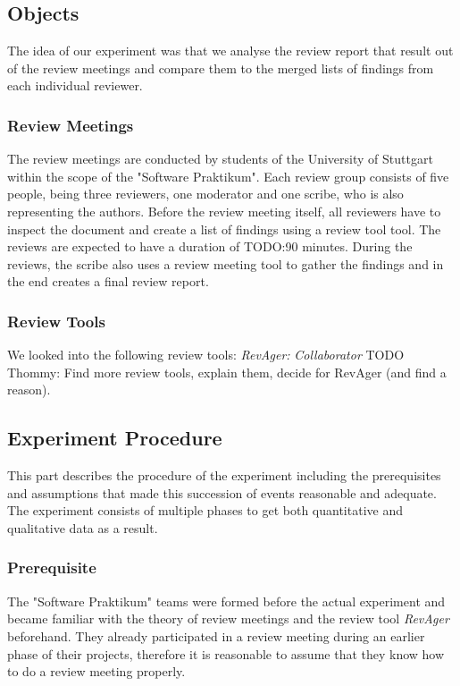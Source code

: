 \subsection{Objects}

The idea of our experiment was that we analyse the review report that result out of the review meetings and compare them to the merged lists of findings from each individual reviewer.

\subsubsection{Review Meetings}

The review meetings are conducted by students of the University of Stuttgart within the scope of the "Software Praktikum". Each review group consists of five people, being three reviewers, one moderator and one scribe, who is also representing the authors. Before the review meeting itself, all reviewers have to inspect the document and create a list of findings using a review tool \cite{TODO:revager Thommy} tool. The reviews are expected to have a duration of TODO:90 minutes. During the reviews, the scribe also uses a review meeting tool to gather the findings and in the end creates a final review report.

\subsubsection{Review Tools}

We looked into the following review tools:
\textit{RevAger:}
\textit{Collaborator}
TODO Thommy: Find more review tools, explain them, decide for RevAger (and find a reason).

\subsection{Experiment Procedure}
This part describes the procedure of the experiment including the prerequisites and assumptions that made this succession of events  reasonable and adequate.
The experiment consists of multiple phases to get both quantitative and qualitative data as a result.
\subsubsection{Prerequisite}
The "Software Praktikum" teams were formed before the actual experiment and became familiar with the theory of review meetings and the review tool \textit{RevAger} beforehand.
They already participated in a review meeting during an earlier phase of their projects, therefore it is reasonable to assume that they know how to do a review meeting properly.
